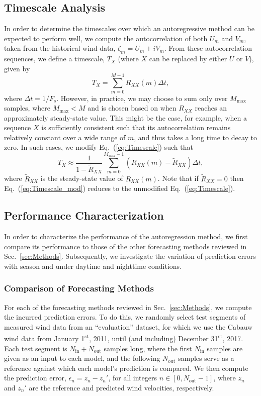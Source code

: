 \documentclass[11pt, oneside]{article}
\newcommand{\eqnref}[1]{Eq.~(\ref{#1})}
\newcommand{\secref}[1]{Sec.~\ref{#1}}
\begin{document}
\subsection{Timescale Analysis}\label{sec:Methodology:Timescale}
In order to determine the timescales over which an autoregressive method can be expected to perform well, we compute the autocorrelation of both $U_m$ and $V_m$, taken from the historical wind data, $\zeta_m = U_m + i V_m$.
From these autocorrelation sequences, we define a timescale, $T_X$ (where $X$ can be replaced by either $U$ or $V$), given by
\begin{equation}\label{eq:Timescale}
T_X = \sum_{m = 0}^{M-1} R_{XX}(m) \Delta t,
\end{equation}
where $\Delta t = 1/F_s$.
However, in practice, we may choose to sum only over $M_\text{max}$ samples, where $M_\text{max} < M$ and is chosen based on when $R_{XX}$ reaches an approximately steady-state value.
This might be the case, for example, when a sequence $X$ is sufficiently consistent such that its autocorrelation remains relatively constant over a wide range of $m$, and thus takes a long time to decay to zero.
In such cases, we modify \eqnref{eq:Timescale} such that
\begin{equation}\label{eq:Timescale_mod}
T_X \approx \frac{1}{1 - \tilde{R}_{XX}} \sum_{m = 0}^{M_\text{max}-1} (R_{XX}(m) - \tilde{R}_{XX}) \Delta t,
\end{equation}
where $\tilde{R}_{XX}$ is the steady-state value of $R_{XX}(m)$.
Note that if $\tilde{R}_{XX} = 0$ then \eqnref{eq:Timescale_mod} reduces to the unmodified \eqnref{eq:Timescale}.

\subsection{Performance Characterization}
In order to characterize the performance of the autoregression method, we first compare its performance to those of the other forecasting methods reviewed in \secref{sec:Methods}.
Subsequently, we investigate the variation of prediction errors with season and under daytime and nighttime conditions.

\subsubsection{Comparison of Forecasting Methods}\label{sec:Methodology:Comparison}
For each of the forecasting methods reviewed in \secref{sec:Methods}, we compute the incurred prediction errors.
To do this, we randomly select test segments of measured wind data from an ``evaluation'' dataset, for which we use the Cabauw wind data from January 1\textsuperscript{st}, 2011, until (and including) December 31\textsuperscript{st}, 2017.
Each test segment is $N_\text{in} + N_\text{out}$ samples long, where the first $N_\text{in}$ samples are given as an input to each model, and the following $N_\text{out}$ samples serve as a reference against which each model's prediction is compared.
We then compute the prediction error, $\epsilon_n = z_n - z_n'$, for all integers $n \in [0,N_\text{out}-1]$, where $z_n$ and $z_n'$ are the reference and predicted wind velocities, respectively.
\end{document}
